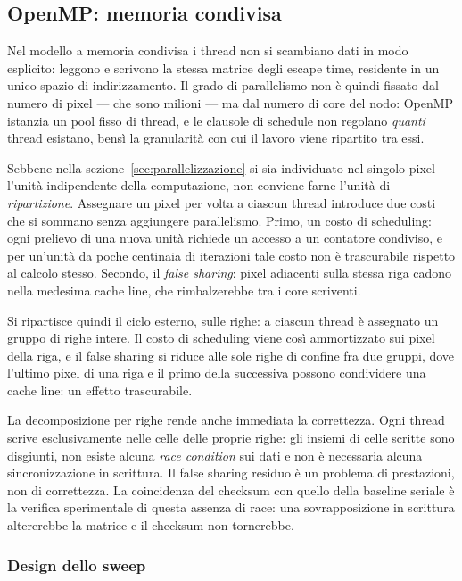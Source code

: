 \subsection{OpenMP: memoria condivisa}
\label{sec:openmp}

Nel modello a memoria condivisa i thread non si scambiano dati in modo
esplicito: leggono e scrivono la stessa matrice degli escape time,
residente in un unico spazio di indirizzamento. Il grado di parallelismo non è
quindi fissato dal numero di pixel --- che sono milioni --- ma dal numero di
core del nodo: OpenMP istanzia un pool fisso di thread, e le clausole di
schedule non regolano \emph{quanti} thread esistano, bensì la granularità con
cui il lavoro viene ripartito tra essi.

Sebbene nella sezione~\ref{sec:parallelizzazione} si sia individuato nel
singolo pixel l'unità indipendente della computazione, non conviene farne
l'unità di \emph{ripartizione}. Assegnare un pixel per volta a ciascun thread
introduce due costi che si sommano senza aggiungere parallelismo. Primo, un
costo di scheduling: ogni prelievo di una nuova unità richiede un accesso a un
contatore condiviso, e per un'unità da poche centinaia di iterazioni tale costo
non è trascurabile rispetto al calcolo stesso. Secondo, il \emph{false sharing}: pixel
adiacenti sulla stessa riga cadono nella medesima cache line, che rimbalzerebbe
tra i core scriventi.

Si ripartisce quindi il ciclo esterno, sulle righe: a ciascun thread è
assegnato un gruppo di righe intere. Il costo di scheduling viene così
ammortizzato sui pixel della riga, e il false sharing si riduce alle sole righe
di confine fra due gruppi, dove l'ultimo pixel di una riga e il primo della
successiva possono condividere una cache line: un effetto trascurabile.

La decomposizione per righe rende anche immediata la correttezza. Ogni thread
scrive esclusivamente nelle celle delle proprie righe: gli insiemi di celle
scritte sono disgiunti, non esiste alcuna \emph{race condition} sui dati e non
è necessaria alcuna sincronizzazione in scrittura. Il false sharing residuo è
un problema di prestazioni, non di correttezza. La coincidenza del
checksum con quello della baseline seriale è la verifica sperimentale di questa
assenza di race: una sovrapposizione in scrittura altererebbe la matrice e il
checksum non tornerebbe.

\subsubsection{Design dello sweep}
\label{sec:openmp-sweep}


